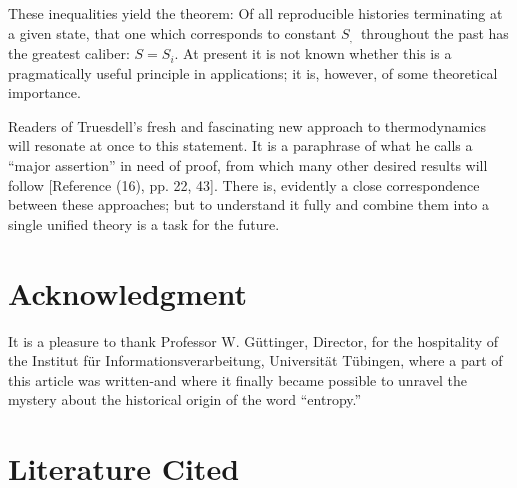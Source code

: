\documentclass{article}
\begin{document}
These inequalities yield the theorem: Of all reproducible histories terminating at a given state, that one which corresponds to constant $S_{\text {, }}$ throughout the past has the greatest caliber: $S=S_i$. At present it is not known whether this is a pragmatically useful principle in applications; it is, however, of some theoretical importance.

Readers of Truesdell's fresh and fascinating new approach to thermodynamics \cite{truesdell1969} will resonate at once to this statement. It is a paraphrase of what he calls a ``major assertion'' in need of proof, from which many other desired results will follow [Reference (16), pp. 22, 43]. There is, evidently a close correspondence between these approaches; but to understand it fully and combine them into a single unified theory is a task for the future.

\section*{Acknowledgment}

It is a pleasure to thank Professor W. Güttinger, Director, for the hospitality of the Institut für Informationsverarbeitung, Universität Tübingen, where a part of this article was written-and where it finally became possible to unravel the mystery about the historical origin of the word ``entropy.''

\section*{Literature Cited}
\end{document}
